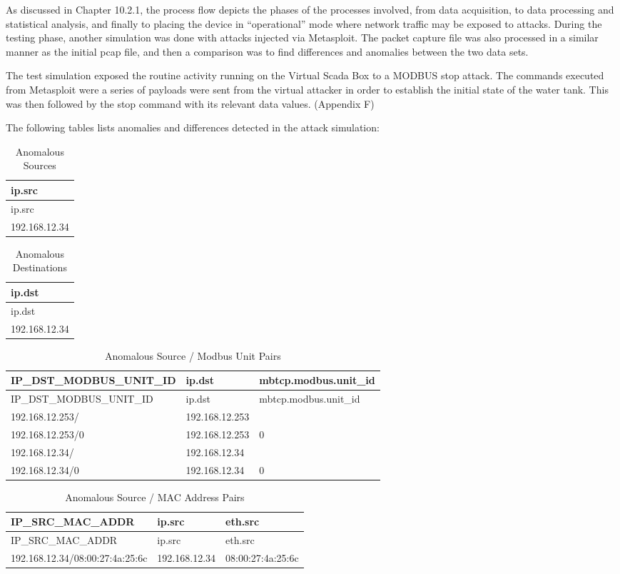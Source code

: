 \documentclass[11pt,]{article}
\begin{document}
As discussed in Chapter 10.2.1, the process flow depicts the phases of
the processes involved, from data acquisition, to data processing and
statistical analysis, and finally to placing the device in
``operational'' mode where network traffic may be exposed to attacks.
During the testing phase, another simulation was done with attacks
injected via Metasploit. The packet capture file was also processed in a
similar manner as the initial pcap file, and then a comparison was to
find differences and anomalies between the two data sets.

The test simulation exposed the routine activity running on the Virtual
Scada Box to a MODBUS stop attack. The commands executed from Metasploit
were a series of payloads were sent from the virtual attacker in order
to establish the initial state of the water tank. This was then followed
by the stop command with its relevant data values. (Appendix F)

The following tables lists anomalies and differences detected in the
attack simulation:

\begin{longtable}[c]{@{}l@{}}
\caption{Anomalous Sources}\tabularnewline
\toprule
ip.src\tabularnewline
\midrule
\endfirsthead
\toprule
ip.src\tabularnewline
\midrule
\endhead
192.168.12.34\tabularnewline
\bottomrule
\end{longtable}

\begin{longtable}[c]{@{}l@{}}
\caption{Anomalous Destinations}\tabularnewline
\toprule
ip.dst\tabularnewline
\midrule
\endfirsthead
\toprule
ip.dst\tabularnewline
\midrule
\endhead
192.168.12.34\tabularnewline
\bottomrule
\end{longtable}

\begin{longtable}[c]{@{}lll@{}}
\caption{Anomalous Source / Modbus Unit Pairs}\tabularnewline
\toprule
IP\_DST\_MODBUS\_UNIT\_ID & ip.dst &
mbtcp.modbus.unit\_id\tabularnewline
\midrule
\endfirsthead
\toprule
IP\_DST\_MODBUS\_UNIT\_ID & ip.dst &
mbtcp.modbus.unit\_id\tabularnewline
\midrule
\endhead
192.168.12.253/ & 192.168.12.253 &\tabularnewline
192.168.12.253/0 & 192.168.12.253 & 0\tabularnewline
192.168.12.34/ & 192.168.12.34 &\tabularnewline
192.168.12.34/0 & 192.168.12.34 & 0\tabularnewline
\bottomrule
\end{longtable}

\begin{longtable}[c]{@{}lll@{}}
\caption{Anomalous Source / MAC Address Pairs}\tabularnewline
\toprule
IP\_SRC\_MAC\_ADDR & ip.src & eth.src\tabularnewline
\midrule
\endfirsthead
\toprule
IP\_SRC\_MAC\_ADDR & ip.src & eth.src\tabularnewline
\midrule
\endhead
192.168.12.34/08:00:27:4a:25:6c & 192.168.12.34 &
08:00:27:4a:25:6c\tabularnewline
\bottomrule
\end{longtable}
\end{document}
